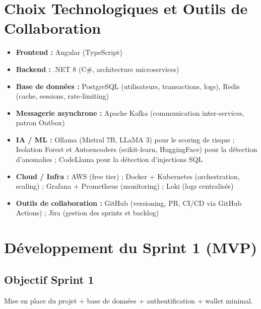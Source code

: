 \documentclass[12pt,a4paper]{report}
\begin{document}
\section{Choix Technologiques et Outils de Collaboration}
\begin{itemize}[leftmargin=*,label=--]
\item \textbf{Frontend :} Angular (TypeScript)
\item \textbf{Backend :} .NET 8 (C\#, architecture microservices)
\item \textbf{Base de données :} PostgreSQL (utilisateurs, transactions, logs), Redis (cache, sessions, rate-limiting)
\item \textbf{Messagerie asynchrone :} Apache Kafka (communication inter-services, patron Outbox)
\item \textbf{IA / ML :} Ollama (Mistral 7B, LLaMA 3) pour le scoring de risque ; Isolation Forest et Autoencoders (scikit-learn, HuggingFace) pour la détection d'anomalies ; CodeLlama pour la détection d'injections SQL
\item \textbf{Cloud / Infra :} AWS (free tier) ; Docker + Kubernetes (orchestration, scaling) ; Grafana + Prometheus (monitoring) ; Loki (logs centralisés)
\item \textbf{Outils de collaboration :} GitHub (versioning, PR, CI/CD via GitHub Actions) ; Jira (gestion des sprints et backlog)
\end{itemize}

\section{Développement du Sprint 1 (MVP)}

\subsection{Objectif Sprint 1}
Mise en place du projet + base de données + authentification + wallet minimal.
\end{document}
